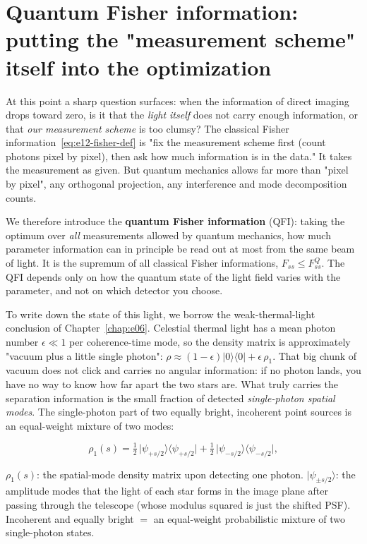 \section{Quantum Fisher information: putting the "measurement scheme" itself into the optimization}
\label{sec:e12-qfi}

At this point a sharp question surfaces: when the information of direct imaging drops toward zero, is it that the \emph{light itself} does not carry enough information, or that \emph{our measurement scheme} is too clumsy? The classical Fisher information~\eqref{eq:e12-fisher-def} is "fix the measurement scheme first (count photons pixel by pixel), then ask how much information is in the data." It takes the measurement as given. But quantum mechanics allows far more than "pixel by pixel", any orthogonal projection, any interference and mode decomposition counts.

We therefore introduce the \textbf{quantum Fisher information} (QFI): taking the optimum over \emph{all} measurements allowed by quantum mechanics, how much parameter information can in principle be read out at most from the same beam of light. It is the supremum of all classical Fisher informations, $F_{ss}\le F_{ss}^{Q}$. The QFI depends only on how the quantum state of the light field varies with the parameter, and not on which detector you choose.

To write down the state of this light, we borrow the weak-thermal-light conclusion of Chapter~\ref{chap:e06}. Celestial thermal light has a mean photon number $\epsilon\ll1$ per coherence-time mode, so the density matrix is approximately "vacuum plus a little single photon": $\rho\approx(1-\epsilon)|0\rangle\langle0|+\epsilon\,\rho_1$. That big chunk of vacuum does not click and carries no angular information: if no photon lands, you have no way to know how far apart the two stars are. What truly carries the separation information is the small fraction of detected \emph{single-photon spatial modes}. The single-photon part of two equally bright, incoherent point sources is an equal-weight mixture of two modes:

\begin{equation}
  \rho_{1}(s)=\tfrac12\,\big|\psi_{+s/2}\big\rangle\big\langle\psi_{+s/2}\big|
             +\tfrac12\,\big|\psi_{-s/2}\big\rangle\big\langle\psi_{-s/2}\big|,
  \label{eq:e12-one-photon}
\end{equation}
\begin{formulaexplain}
$\rho_1(s)$: the spatial-mode density matrix upon detecting one photon. $|\psi_{\pm s/2}\rangle$: the amplitude modes that the light of each star forms in the image plane after passing through the telescope (whose modulus squared is just the shifted PSF). Incoherent and equally bright $=$ an equal-weight probabilistic mixture of two single-photon states.
\end{formulaexplain}

